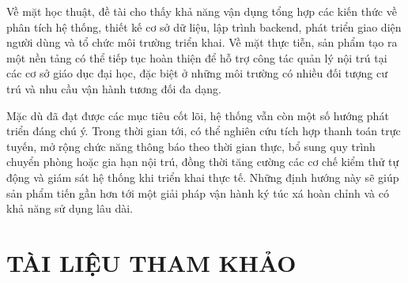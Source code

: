 \documentclass[12pt]{article}
\begin{document}
Về mặt học thuật, đề tài cho thấy khả năng vận dụng tổng hợp các kiến thức về phân tích hệ thống, thiết kế cơ sở dữ liệu, lập trình backend, phát triển giao diện người dùng và tổ chức môi trường triển khai. Về mặt thực tiễn, sản phẩm tạo ra một nền tảng có thể tiếp tục hoàn thiện để hỗ trợ công tác quản lý nội trú tại các cơ sở giáo dục đại học, đặc biệt ở những môi trường có nhiều đối tượng cư trú và nhu cầu vận hành tương đối đa dạng.

Mặc dù đã đạt được các mục tiêu cốt lõi, hệ thống vẫn còn một số hướng phát triển đáng chú ý. Trong thời gian tới, có thể nghiên cứu tích hợp thanh toán trực tuyến, mở rộng chức năng thông báo theo thời gian thực, bổ sung quy trình chuyển phòng hoặc gia hạn nội trú, đồng thời tăng cường các cơ chế kiểm thử tự động và giám sát hệ thống khi triển khai thực tế. Những định hướng này sẽ giúp sản phẩm tiến gần hơn tới một giải pháp vận hành ký túc xá hoàn chỉnh và có khả năng sử dụng lâu dài.

\newpage
\section*{TÀI LIỆU THAM KHẢO}
\end{document}
